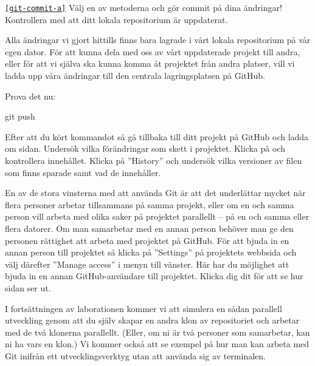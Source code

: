 \begin{Datorarbete}
\texttt{\ref{git-commit-a}}  Välj en av metoderna och gör commit på dina ändringar! Kontrollera med  att ditt lokala repositorium är uppdaterat.
\\

\item Alla ändringar vi gjort hittills finns bara lagrade i vårt lokala repositorium på vår egen dator. För att kunna dela med oss av vårt uppdaterade projekt till andra, eller för att vi själva ska kunna komma åt projektet från andra platser, vill vi ladda upp våra ändringar till den centrala lagringsplatsen på GitHub.

Prova det nu:

\begin{Code}
git push
\end{Code}

Efter att du kört kommandot så gå tillbaka till ditt projekt på GitHub och ladda om sidan. Undersök vilka förändringar som skett i projektet. Klicka på  och kontrollera innehållet. Klicka på ''History'' och undersök vilka versioner av filen som finns sparade samt vad de innehåller.

\item En av de stora vinsterna med att använda Git är att det underlättar mycket när flera personer arbetar tillsammans på samma projekt, eller om en och samma person vill arbeta med olika saker på projektet parallellt -- på en och samma eller flera datorer. Om man samarbetar med en annan person behöver man ge den personen rättighet att arbeta med projektet på GitHub. För att bjuda in en annan person till projektet så klicka på ''Settings'' på projektets webbsida och välj därefter ''Manage access'' i menyn till vänster. Här har du möjlighet att bjuda in en annan GitHub-användare till projektet. Klicka dig dit för att se hur sidan ser ut.

I fortsättningen av laborationen kommer vi att simulera en sådan parallell utveckling genom att du själv skapar en andra klon av repositoriet och arbetar med de två klonerna parallellt. (Eller, om ni är två personer som samarbetar, kan ni ha vars en klon.) Vi kommer också att se exempel på hur man kan arbeta med Git inifrån ett utvecklingsverktyg utan att använda sig av terminalen.

%


\end{Datorarbete}

